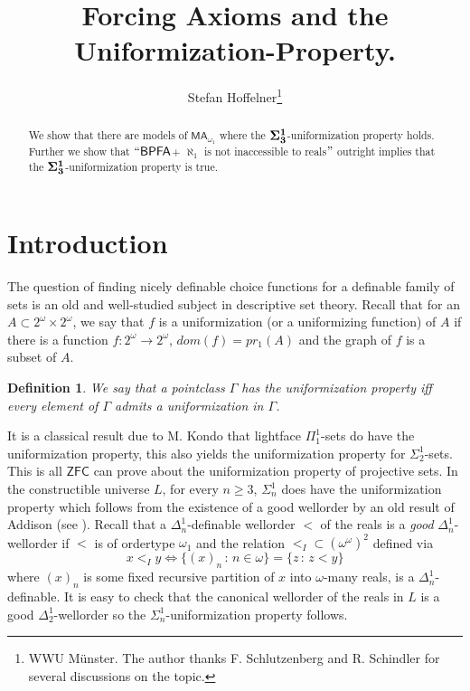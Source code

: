 \documentclass[a4paper,12pt]{article}
\title{Forcing Axioms and the Uniformization-Property.}
\author{ Stefan Hoffelner\footnote{WWU M\"unster. The author thanks F. Schlutzenberg and R. Schindler for several discussions on the topic. }}
\newtheorem{definition}[theorem]{Definition}
\newcommand{\ZFC}{\mathsf{ZFC}}
\newcommand{\BPFA}{\mathsf{BPFA}}
\newcommand{\MA}{\mathsf{MA}_{\omega_1}}
\begin{document}
\maketitle

\begin{abstract}
We show that there are models of $\MA$ where the $\bf{\Sigma^1_3}$-uniformization property holds. Further we show that $``\BPFA$+ $\aleph_1$ is not inaccessible to reals$"$ outright implies that the $\bf{\Sigma^1_3}$-uniformization property is true. 
\end{abstract}

\section{Introduction}

The question of finding nicely definable 
choice functions for a  definable family of sets is an old and well-studied subject in descriptive set theory.
Recall that for an $A \subset 2^{\omega} \times 2^{\omega}$, we say that $f$ is a uniformization (or a uniformizing function) of
$A$ if there is a function $f: 2^{\omega} \rightarrow 2^{\omega}$, 
$dom(f)= pr_1(A)$ and the graph of $f$ is a subset of $A$.


\begin{definition}
 We say that a pointclass $\Gamma$ has the uniformization
 property iff every element of $\Gamma$ admits a uniformization 
 in $\Gamma$.
\end{definition}

It is a classical result due to M. Kondo that lightface $\Pi^1_{1}$-sets do have the 
uniformization property, this also yields the uniformization property for $\Sigma^1_{2}$-sets. This is all $\ZFC$ can prove about the uniformization property of projective sets. In the constructible universe $L$, for every $n \ge 3$, $\Sigma^1_{n}$ does have the uniformization property which follows from the existence of a good wellorder by an old result of Addison (see \cite{Addison}). Recall that a $\Delta^1_n$-definable wellorder $<$ of the reals is a \emph{good} $\Delta^1_n$-wellorder if $<$ is of ordertype $\omega_1$ and the relation $<_{I} \subset (\omega^{\omega})^2$ defined via
\[ x <_I y \Leftrightarrow \{(x)_n \, : \, n \in \omega\}= \{z \, : \, z < y\} \]
where $(x)_n$ is some fixed recursive partition of $x$ into $\omega$-many reals, is a $\Delta^1_n$-definable. It is easy to check that the canonical wellorder of the reals in $L$ is a good $\Delta^1_2$-wellorder so the $\Sigma^1_n$-uniformization property follows.
\end{document}
